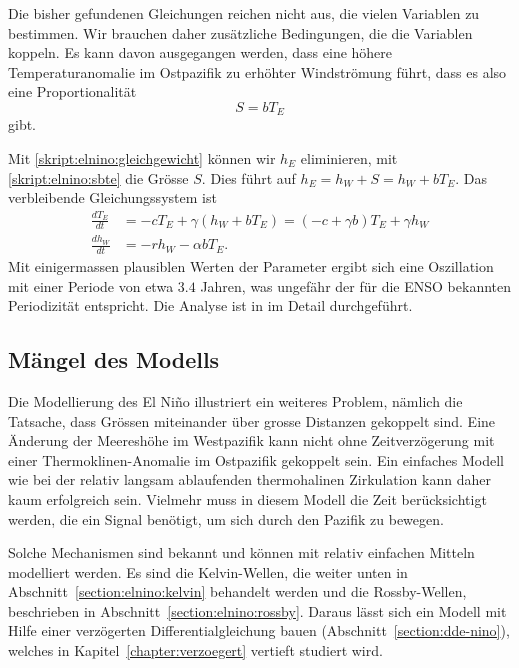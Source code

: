 Die bisher gefundenen Gleichungen reichen nicht aus, die vielen Variablen
zu bestimmen.
Wir brauchen daher zusätzliche Bedingungen, die die Variablen koppeln.
Es kann davon ausgegangen werden, dass eine höhere Temperaturanomalie
im Ostpazifik zu erhöhter Windströmung führt, dass es also eine
Proportionalität 
\begin{equation}
S=bT_E
\label{skript:elnino:sbte}
\end{equation}
gibt.

Mit \eqref{skript:elnino:gleichgewicht} können wir $h_E$ eliminieren,
mit \eqref{skript:elnino:sbte} die Grösse $S$.
Dies führt auf $h_E=h_W+S=h_W+bT_E$.
Das verbleibende Gleichungssystem ist
\begin{align*}
\frac{dT_E}{dt}
&=
-cT_E + \gamma(h_W+bT_E)
=
(-c+\gamma b)T_E
+
\gamma h_W
\\
\frac{dh_W}{dt}
&=
-rh_W - \alpha b T_E.
\end{align*}
Mit einigermassen plausiblen Werten der Parameter ergibt sich eine
Oszillation mit einer Periode von etwa $3.4$ Jahren, was ungefähr der
für die ENSO bekannten Periodizität entspricht.
Die Analyse ist in \cite{skript:kaperengler} im Detail durchgeführt.


\subsection{Mängel des Modells\label{subsection:maengel des modells}}
Die Modellierung des El Niño illustriert ein weiteres Problem, nämlich
die Tatsache, dass Grössen miteinander über grosse Distanzen gekoppelt
sind.
Eine Änderung der Meereshöhe im Westpazifik kann nicht ohne Zeitverzögerung
mit einer Thermoklinen-Anomalie im Ostpazifik gekoppelt sein.
Ein einfaches Modell wie bei der relativ langsam ablaufenden thermohalinen
Zirkulation kann daher kaum erfolgreich sein.
Vielmehr muss in diesem Modell die Zeit berücksichtigt werden, die ein
Signal benötigt, um sich durch den Pazifik zu bewegen.

Solche Mechanismen sind bekannt und können mit relativ einfachen
Mitteln modelliert werden.
Es sind die Kelvin-Wellen, die weiter unten in
Abschnitt~\ref{section:elnino:kelvin}
behandelt werden und die Rossby-Wellen, beschrieben in
Abschnitt~\ref{section:elnino:rossby}.
Daraus lässt sich ein Modell mit Hilfe einer verzögerten Differentialgleichung
bauen (Abschnitt~\ref{section:dde-nino}), welches in
Kapitel~\ref{chapter:verzoegert} vertieft studiert wird.


